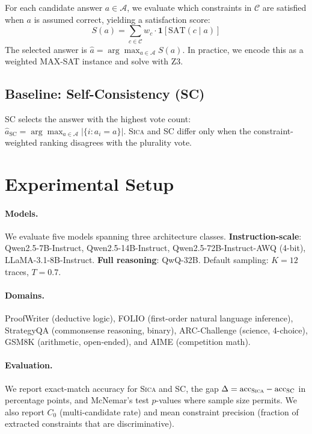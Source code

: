 \documentclass[11pt,a4paper]{article}
\newcommand{\sica}{\textsc{Sica}}
\newcommand{\scm}{\textsc{SC}}
\newcommand{\czero}{C_0}
\begin{document}
For each candidate answer $a \in \mathcal{A}$, we evaluate which constraints in $\mathcal{C}$ are satisfied when $a$ is assumed correct, yielding a satisfaction score:
\begin{equation}
  S(a) = \sum_{c \in \mathcal{C}} w_c \cdot \mathbf{1}[\text{SAT}(c \mid a)]
\end{equation}
The selected answer is $\hat{a} = \arg\max_{a \in \mathcal{A}} S(a)$. In practice, we encode this as a weighted MAX-SAT instance and solve with Z3.

\subsection{Baseline: Self-Consistency (SC)}

SC selects the answer with the highest vote count: $\hat{a}_{\text{SC}} = \arg\max_{a \in \mathcal{A}} |\{i : a_i = a\}|$. \sica{} and SC differ only when the constraint-weighted ranking disagrees with the plurality vote.

\section{Experimental Setup}

\paragraph{Models.} We evaluate five models spanning three architecture classes. \textbf{Instruction-scale}: Qwen2.5-7B-Instruct, Qwen2.5-14B-Instruct, Qwen2.5-72B-Instruct-AWQ (4-bit), LLaMA-3.1-8B-Instruct. \textbf{Full reasoning}: QwQ-32B. Default sampling: $K=12$ traces, $T=0.7$.

\paragraph{Domains.} ProofWriter (deductive logic), FOLIO (first-order natural language inference), StrategyQA (commonsense reasoning, binary), ARC-Challenge (science, 4-choice), GSM8K (arithmetic, open-ended), and AIME (competition math).

\paragraph{Evaluation.} We report exact-match accuracy for \sica{} and SC, the gap $\Delta = \text{acc}_{\sica} - \text{acc}_{\scm}$ in percentage points, and McNemar's test $p$-values where sample size permits. We also report $\czero$ (multi-candidate rate) and mean constraint precision (fraction of extracted constraints that are discriminative).
\end{document}
